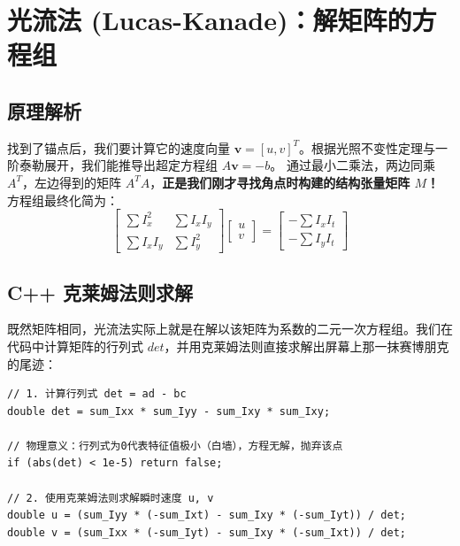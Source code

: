 \documentclass[12pt, a4paper]{ctexart}
\begin{document}
\section{光流法 (Lucas-Kanade)：解矩阵的方程组}
\subsection{原理解析}
找到了锚点后，我们要计算它的速度向量 $\mathbf{v} = [u, v]^T$。根据光照不变性定理与一阶泰勒展开，我们能推导出超定方程组 $A\mathbf{v} = -b$。
通过最小二乘法，两边同乘 $A^T$，左边得到的矩阵 $A^T A$，\textbf{正是我们刚才寻找角点时构建的结构张量矩阵 $M$！}
方程组最终化简为：
\begin{equation}
\begin{bmatrix}
\sum I_x^2 & \sum I_x I_y \\
\sum I_x I_y & \sum I_y^2
\end{bmatrix}
\begin{bmatrix} u \\ v \end{bmatrix}
=
\begin{bmatrix}
-\sum I_x I_t \\
-\sum I_y I_t
\end{bmatrix}
\end{equation}

\subsection{C++ 克莱姆法则求解}
既然矩阵相同，光流法实际上就是在解以该矩阵为系数的二元一次方程组。我们在代码中计算矩阵的行列式 $det$，并用克莱姆法则直接求解出屏幕上那一抹赛博朋克的尾迹：
\begin{lstlisting}
// 1. 计算行列式 det = ad - bc
double det = sum_Ixx * sum_Iyy - sum_Ixy * sum_Ixy;

// 物理意义：行列式为0代表特征值极小（白墙），方程无解，抛弃该点
if (abs(det) < 1e-5) return false; 

// 2. 使用克莱姆法则求解瞬时速度 u, v
double u = (sum_Iyy * (-sum_Ixt) - sum_Ixy * (-sum_Iyt)) / det;
double v = (sum_Ixx * (-sum_Iyt) - sum_Ixy * (-sum_Ixt)) / det;
\end{lstlisting}
\end{document}
